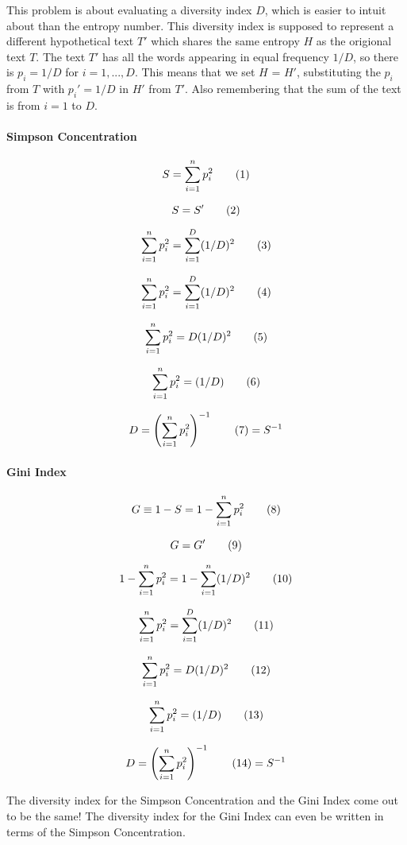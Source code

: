 This problem is about evaluating a diversity index $D$, which is easier to intuit about than the entropy number. This diversity index is supposed to represent a different hypothetical text $T'$ which shares the same entropy $H$ as the origional text $T$. The text $T'$ has all the words appearing in equal frequency $1/D$, so there is $p_i = 1/D$ for $i = 1, ... ,D$. This means that we set $H$ = $H'$, substituting the $p_i$ from $T$ with $p_i' = 1/D$ in $H'$ from $T'$. Also remembering that the sum of the text is from $i=1$ to $D$.

\paragraph{Simpson Concentration}
\[
  S =
  \sum_{i=1}^{n}
  p_i^2
  \addtag
\]

\[
  S = S'
  \addtag
\]

\[
  \sum_{i=1}^{n}
  p_i^2
  =
  \sum_{i=1}^{D}
  (1/D)^2
  \addtag
\]

\[
  \sum_{i=1}^{n}
  p_i^2
  =
  \sum_{i=1}^{D}
  (1/D)^2
  \addtag
\]

\[
  \sum_{i=1}^{n}
  p_i^2
  =
  D
  (1/D)^2
  \addtag
\]

\[
  \sum_{i=1}^{n}
  p_i^2
  =
  (1/D)
  \addtag
\]

\[
  D =
  \left(
    \sum_{i=1}^{n}
    p_i^2
  \right)^{-1}
  \addtag
  =
  S^{-1}
\]

\paragraph{Gini Index}
\[
  G \equiv
  1 - S
  =
  1 -
  \sum_{i=1}^{n}
  p_i^2
  \addtag
\]

\[
  G = G'
  \addtag
\]

\[
  1 -
  \sum_{i=1}^{n}
  p_i^2
  = 
  1 -
  \sum_{i=1}^{n}
  (1/D)^2
  \addtag
\]

\[
  \sum_{i=1}^{n}
  p_i^2
  =
  \sum_{i=1}^{D}
  (1/D)^2
  \addtag
\]

\[
  \sum_{i=1}^{n}
  p_i^2
  =
  D
  (1/D)^2
  \addtag
\]

\[
  \sum_{i=1}^{n}
  p_i^2
  =
  (1/D)
  \addtag
\]

\[
  D =
  \left(
    \sum_{i=1}^{n}
    p_i^2
  \right)^{-1}
  \addtag
  =
  S^{-1}
\]

The diversity index for the Simpson Concentration and the Gini Index come out to be the same!
The diversity index for the Gini Index can even be written in terms of the Simpson Concentration.

